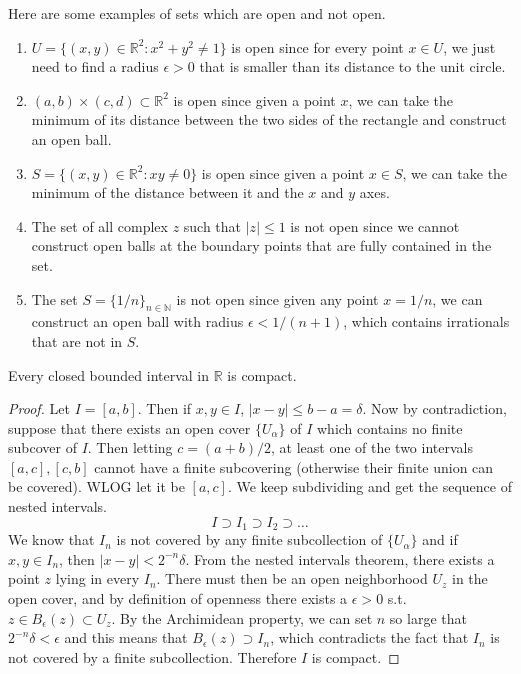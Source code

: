   \begin{example}
    Here are some examples of sets which are open and not open. 
    \begin{enumerate}
      \item $U=\{(x,y)\in \mathbb{R}^2 : x^2+y^2 \neq 1\}$ is open since for every point $x \in U$, we just need to find a radius $\epsilon > 0$ that is smaller than its distance to the unit circle. 
      \item $(a, b) \times (c, d) \subset \mathbb{R}^2$ is open since given a point $x$, we can take the minimum of its distance between the two sides of the rectangle and construct an open ball. 
      \item $S=\{(x,y)\in \mathbb{R}^2:xy\neq 0\}$ is open since given a point $x \in S$, we can take the minimum of the distance between it and the $x$ and $y$ axes. 
      \item The set of all complex $z$ such that $|z| \leq 1$ is not open since we cannot construct open balls at the boundary points that are fully contained in the set. 
      \item The set $S = \{1/n\}_{n \in \mathbb{N}}$ is not open since given any point $x = 1/n$, we can construct an open ball with radius $\epsilon < 1/(n+1)$, which contains irrationals that are not in $S$. 
    \end{enumerate}
  \end{example}

  \begin{corollary}
    Every closed bounded interval in $\mathbb{R}$ is compact. 
  \end{corollary}
  \begin{proof}
    Let $I = [a, b]$. Then if $x, y \in I$, $|x - y| \leq b - a = \delta$. Now by contradiction, suppose that there exists an open cover $\{U_\alpha\}$ of $I$ which contains no finite subcover of $I$. Then letting $c = (a + b)/2$, at least one of the two intervals $[a, c], [c, b]$ cannot have a finite subcovering (otherwise their finite union can be covered). WLOG let it be $[a, c]$. We keep subdividing and get the sequence of nested intervals. 
    \begin{equation}
      I \supset I_1 \supset I_2 \supset \ldots 
    \end{equation}
    We know that $I_n$ is not covered by any finite subcollection of $\{U_\alpha\}$ and if $x, y \in I_n$, then $|x - y| < 2^{-n} \delta$. From the nested intervals theorem, there exists a point $z$ lying in every $I_n$. There must then be an open neighborhood $U_z$ in the open cover, and by definition of openness there exists a $\epsilon > 0$ s.t. $z \in B_\epsilon (z) \subset U_z$. By the Archimidean property, we can set $n$ so large that $2^{-n} \delta < \epsilon$ and this means that $B_\epsilon (z) \supset I_n$, which contradicts the fact that $I_n$ is not covered by a finite subcollection. Therefore $I$ is compact. 
  \end{proof}


